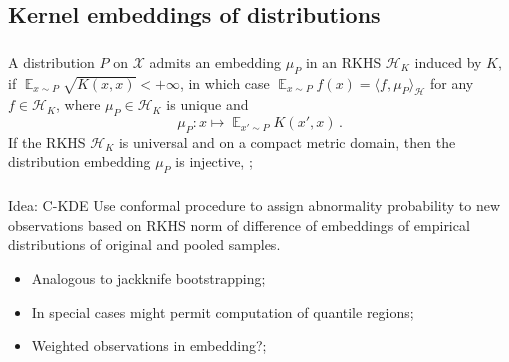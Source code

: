 \documentclass[t]{beamer}  %
\newcommand{\Xcal}{\mathcal{X}}
\newcommand{\Hcal}{\mathcal{H}}
\newcommand{\ex}{\mathop{\mathbb{E}}\nolimits}
\begin{document}

\subsection{Kernel embeddings of distributions} %
\label{sub:kernel_embeddings_of_distributions}

\begin{frame}[c]\frametitle{\insertsection}
  \framesubtitle{\insertsubsection}
  A distribution $P$ on $\Xcal$ admits an embedding $\mu_P$ in an RKHS $\Hcal_K$
  induced by $K$, if $\ex_{x\sim P} \sqrt{K(x,x)} < +\infty$, in which case
  $\ex_{x\sim P} f(x) = \langle f, \mu_P \rangle_\Hcal $ for any $f\in \Hcal_K$,
  where $\mu_P\in \Hcal_K$ is unique and
  $$ \mu_P: x \mapsto \ex_{x'\sim P} K(x', x) \,. $$
  If the RKHS $\Hcal_K$ is universal and on a compact metric domain, then the
  distribution embedding $\mu_P$ is injective, \cite{gretton2012};
\end{frame}

\begin{frame}[c]\frametitle{\insertsection}
  \framesubtitle{\insertsubsection}
  \begin{block}{Idea: C-KDE}
    Use conformal procedure to assign abnormality probability to new observations
    based on RKHS norm of difference of embeddings of empirical distributions of
    original and pooled samples.
    \begin{itemize}
      \item Analogous to jackknife bootstrapping;
      \item In special cases might permit computation of quantile regions;
      \item Weighted observations in embedding?;
    \end{itemize}
  \end{block}
\end{frame}
\end{document}
